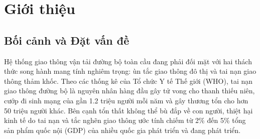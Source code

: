 \documentclass[a4paper]{article}
\begin{document}
\clearpage

\setcounter{tocdepth}{2}
\begin{singlespace}
\setlength{\parskip}{0pt}
{\fontsize{11pt}{13.5pt}\selectfont
\tableofcontents
\vspace{0.15cm}
\listoftables
}
\end{singlespace}
\clearpage

\setcounter{page}{1}

\section{Giới thiệu}

\subsection{Bối cảnh và Đặt vấn đề}
Hệ thống giao thông vận tải đường bộ toàn cầu đang phải đối mặt với hai thách thức song hành mang tính nghiêm trọng: ùn tắc giao thông đô thị và tai nạn giao thông thảm khốc. Theo các thống kê của Tổ chức Y tế Thế giới (WHO), tai nạn giao thông đường bộ là nguyên nhân hàng đầu gây tử vong cho thanh thiếu niên, cướp đi sinh mạng của gần 1.2 triệu người mỗi năm và gây thương tổn cho hơn 50 triệu người khác. Bên cạnh tổn thất không thể bù đắp về con người, thiệt hại kinh tế do tai nạn và tắc nghẽn giao thông ước tính chiếm từ 2\% đến 5\% tổng sản phẩm quốc nội (GDP) của nhiều quốc gia phát triển và đang phát triển.
\end{document}
